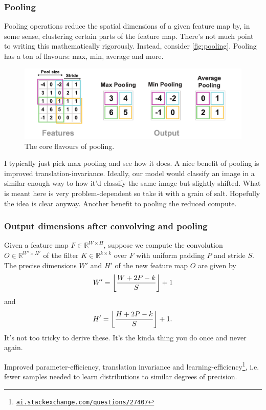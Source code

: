 \documentclass[11pt]{article}
\begin{document}
\subsubsection{Pooling}
Pooling operations reduce the spatial dimensions of a given feature map by, in some sense, clustering certain parts of the feature map. There's not much point to writing this mathematically rigorously. Instead, consider \autoref{fig:pooling}. Pooling has a ton of flavours: max, min, average and more.

\begin{figure}[ht]
    \centering
    \includegraphics[width=1\textwidth]{./figures/neural_nets/CNN_pooling.pdf}
    \caption{The core flavours of pooling. }
    \label{fig:pooling}
\end{figure}

\noindent I typically just pick max pooling and see how it does. A nice benefit of pooling is improved translation-invariance. Ideally, our model would classify an image in a similar enough way to how it'd classify the same image but slightly shifted. What is meant here is very problem-dependent so take it with a grain of salt. Hopefully the idea is clear anyway. Another benefit to pooling the reduced compute.

\subsubsection{Output dimensions after convolving and pooling}
Given a feature map $F\in\mathbb{R}^{W\times H}$, suppose we compute the convolution $O\in\mathbb{R}^{W'\times H'}$ of the filter $K\in\mathbb{R}^{k\times k}$ over $F$ with uniform padding $P$ and stride $S$. The precise dimensions $W'$ and $H'$ of the new feature map $O$ are given by
$$
W'
=
\left\lfloor
\frac{W+2P-k}{S}
\right\rfloor
+1
$$
and
$$
H'
=
\left\lfloor
\frac{H+2P-k}{S}
\right\rfloor
+1.
$$
It's not too tricky to derive these. It's the kinda thing you do once and never again. 

\begin{tcolorbox}[title={\centering\textbf{Why use a CNN over an MLP?}}, colback=myLightBlue, colbacktitle=myDarkBlue, colframe=myDarkBlue, coltitle=white]
    Improved parameter-efficiency, translation invariance and learning-efficiency\footnote{\href{https://ai.stackexchange.com/questions/27407/what-does-statistical-efficiency-mean-in-this-context}{\texttt{ai.stackexchange.com/questions/27407}}}, i.e. fewer samples needed to learn distributions to similar degrees of precision.
\end{tcolorbox}
\end{document}
